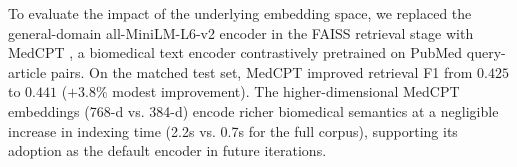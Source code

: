\documentclass[journal]{IEEEtran}
\newcommand{\modelname}{PC-RadNet}
\begin{document}
To evaluate the impact of the underlying embedding space, we replaced the general-domain all-MiniLM-L6-v2 encoder in the FAISS retrieval stage with MedCPT \cite{jin2023medcpt}, a biomedical text encoder contrastively pretrained on PubMed query-article pairs. On the matched test set, MedCPT improved retrieval F1 from $0.425$ to $0.441$ ($+3.8\%$ modest improvement). The higher-dimensional MedCPT embeddings (768-d vs. 384-d) encode richer biomedical semantics at a negligible increase in indexing time (2.2s vs. 0.7s for the full corpus), supporting its adoption as the default encoder in future iterations.


\end{document}
